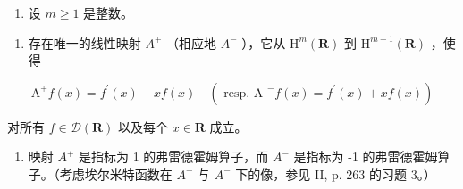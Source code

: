 \begin{enumerate}
\def\labelenumi{\arabic{enumi})}
\setcounter{enumi}{32}
\tightlist
\item
  设 \(m \geqslant 1\) 是整数。
\end{enumerate}

\begin{enumerate}
\def\labelenumi{\alph{enumi})}
\tightlist
\item
  存在唯一的线性映射 \(A^{+}\) （相应地 \(A^{-}\) ），它从 \(\mathrm{H}^{m}(\mathbf{R})\) 到 \(\mathrm{H}^{m-1}(\mathbf{R})\) ，使得
\end{enumerate}

\[
\mathrm{A} ^ {+} f (x) = f ^ {\prime} (x) - x f (x) \quad (\text { resp.   A } ^ {-} f (x) = f ^ {\prime} (x) + x f (x))
\]

对所有 \(f \in \mathcal{D}(\mathbf{R})\) 以及每个 \(x \in \mathbf{R}\) 成立。

\begin{enumerate}
\def\labelenumi{\alph{enumi})}
\setcounter{enumi}{1}
\tightlist
\item
  映射 \(A^{+}\) 是指标为 1 的弗雷德霍姆算子，而 \(A^{-}\) 是指标为 -1 的弗雷德霍姆算子。（考虑埃尔米特函数在 \(A^{+}\) 与 \(A^{-}\) 下的像，参见 II, p. 263 的习题 3。）
\end{enumerate}
\relax{}
